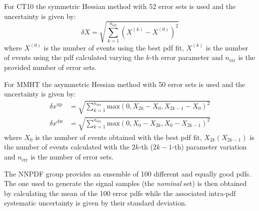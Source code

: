 For CT10 the symmetric Hessian method with 52 error sets is used and the
uncertainty is given by:
\begin{equation}
  \label{eq:119}
  \delta X = \sqrt{\sum_{k = 1}^{n_\mathrm{err}} \left(X^{(k)} -
      X^{(0)} \right)^2}
\end{equation}
where $X^{(0)}$ is the number of events using the best \gls{pdf} fit, $X^{(k)}$
is the number of events using the \gls{pdf} calculated varying the $k$-th error
parameter and $n_\mathrm{err}$ is the provided number of error sets.

For MMHT the asymmetric Hessian method with 50 error sets is used and the
uncertainty is given by:
\begin{align}
  \label{eq:120}
  \delta x^{\mathrm{up}} & = \sqrt{\sum_{k = 1}^{n_\mathrm{err}}
                           \mathrm{max}(0, X_{2k} - X_0, X_{2k - 1} - X_0)^2} \\
  \delta x^{\mathrm{dw}} & = \sqrt{\sum_{k = 1}^{n_\mathrm{err}}
                           \mathrm{max}(0, X_0 - X_{2k}, X_0 - X_{2k - 1})^2}
\end{align}
where $X_0$ is the number of events obtained with the best \gls{pdf} fit,
$X_{2k} (X_{2k -1})$ is the number of events calculated with the $2k$-th
($2k -1$-th) parameter variation and $n_\mathrm{err}$ is the number of error
sets.

The NNPDF group provides an ensemble of 100 different and equally good
\glspl{pdf}. The one used to generate the signal samples (the \emph{nominal}
set) is then obtained by calculating the mean of the 100 error \glspl{pdf} while
the associated intra-\gls{pdf} systematic uncertainty is given by their standard
deviation.

